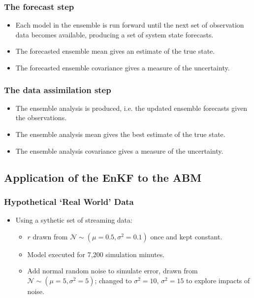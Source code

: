 \subsubsection{The forecast step}
\label{methods:enkf:forecast}

\begin{itemize}
    \item Each model in the ensemble is run forward until the next set of observation data becomes available, producing a set of system state forecasts.
    \item The forecasted ensemble mean gives an estimate of the true state.
    \item The forecasted ensemble covariance gives a measure of the uncertainty.
\end{itemize}

\subsubsection{The data assimilation step}
\label{methods:enkf:assimilation}

\begin{itemize}
    \item The ensemble analysis is produced, i.e. the updated ensemble forecasts given the observations.
    \item The ensemble analysis mean gives the best estimate of the true state.
    \item The ensemble analysis covariance gives a measure of the uncertainty.
\end{itemize}

\subsection{Application of the EnKF to the ABM}
\label{malleson:methods:application}

\subsubsection{Hypothetical `Real World' Data}
\label{methods:application:data}

\begin{itemize}
    \item Using a sythetic set of streaming data:
    \begin{itemize}    
        \item $r$ drawn from $\mathcal{N} \sim (\mu=0.5, \sigma^2=0.1)$ once and kept constant.
        \item Model executed for 7,200 simulation minutes.
        \item Add normal random noise to simulate error, drawn from $\mathcal{N} \sim (\mu=5, \sigma^2=5)$; changed to $\sigma^2=10$, $\sigma^2=15$ to explore impacts of noise.
    \end{itemize}
\end{itemize}

